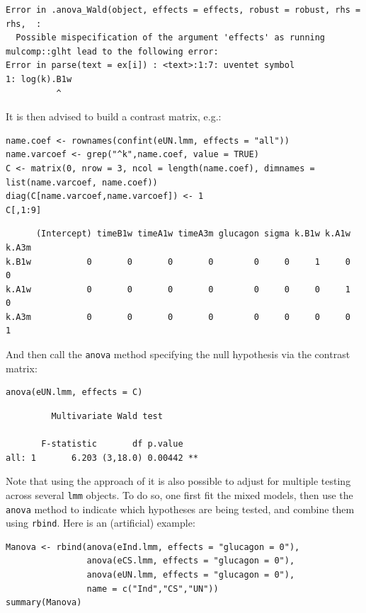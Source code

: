 \documentclass[12pt]{article}
\begin{document}
\begin{verbatim}
Error in .anova_Wald(object, effects = effects, robust = robust, rhs = rhs,  : 
  Possible mispecification of the argument 'effects' as running mulcomp::glht lead to the following error: 
Error in parse(text = ex[i]) : <text>:1:7: uventet symbol
1: log(k).B1w
          ^
\end{verbatim}


\clearpage

It is then advised to build a contrast matrix, e.g.:
\lstset{language=r,label= ,caption= ,captionpos=b,numbers=none}
\begin{lstlisting}
name.coef <- rownames(confint(eUN.lmm, effects = "all"))
name.varcoef <- grep("^k",name.coef, value = TRUE)
C <- matrix(0, nrow = 3, ncol = length(name.coef), dimnames = list(name.varcoef, name.coef))
diag(C[name.varcoef,name.varcoef]) <- 1
C[,1:9]
\end{lstlisting}

\begin{verbatim}
      (Intercept) timeB1w timeA1w timeA3m glucagon sigma k.B1w k.A1w k.A3m
k.B1w           0       0       0       0        0     0     1     0     0
k.A1w           0       0       0       0        0     0     0     1     0
k.A3m           0       0       0       0        0     0     0     0     1
\end{verbatim}


And then call the \texttt{anova} method specifying the null hypothesis via the
contrast matrix:
\lstset{language=r,label= ,caption= ,captionpos=b,numbers=none}
\begin{lstlisting}
anova(eUN.lmm, effects = C)
\end{lstlisting}

\begin{verbatim}
	     Multivariate Wald test 

       F-statistic       df p.value   
all: 1       6.203 (3,18.0) 0.00442 **
\end{verbatim}


Note that using the approach of \cite{pipper2012versatile} it is also
possible to adjust for multiple testing across several \texttt{lmm}
objects. To do so, one first fit the mixed models, then use the
\texttt{anova} method to indicate which hypotheses are being tested, and
combine them using \texttt{rbind}. Here is an (artificial) example:
\lstset{language=r,label= ,caption= ,captionpos=b,numbers=none}
\begin{lstlisting}
Manova <- rbind(anova(eInd.lmm, effects = "glucagon = 0"),
                anova(eCS.lmm, effects = "glucagon = 0"),
                anova(eUN.lmm, effects = "glucagon = 0"),
                name = c("Ind","CS","UN"))
summary(Manova) 
\end{lstlisting}
\end{document}
